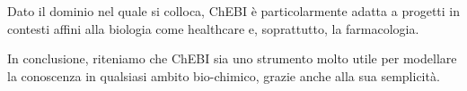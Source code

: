 \documentclass[12pt,a4paper,openright,twoside]{book}
\begin{document}
Dato il dominio nel quale si colloca, ChEBI è particolarmente adatta a progetti in contesti affini alla biologia come healthcare e, soprattutto, la farmacologia.

In conclusione, riteniamo che ChEBI sia uno strumento molto utile per modellare la conoscenza in qualsiasi ambito bio-chimico, grazie anche alla sua semplicità.




\end{document}
